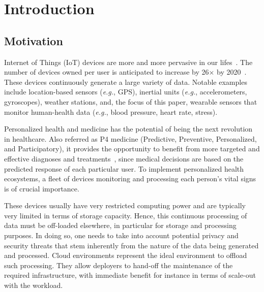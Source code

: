 \chapter{Introduction} \label{chap:introduction}

\section{Motivation}

Internet of Things (IoT) devices are more and more pervasive in our lifes~\cite{Gartner2017}.
The number of devices owned per user is anticipated to increase by 26$\times$ by 2020~\cite{Barbosa2017}.
These devices continuously generate a large variety of data.
Notable examples include location-based sensors (\emph{e.g.}, GPS), inertial units (\emph{e.g.}, accelerometers, gyroscopes), weather stations, and, the focus of this paper, wearable sensors that monitor human-health data (\emph{e.g.}, blood pressure, heart rate, stress).

Personalized health and medicine has the potential of being the next revolution in healthcare.
Also referred as P4 medicine (Predictive, Preventive, Personalized, and Participatory), it provides the opportunity to benefit from more targeted and effective diagnoses and treatments~\cite{Cumming2014}, since medical decisions are based on the predicted response of each particular user.
To implement personalized health ecosystems, a fleet of devices monitoring and processing each person's vital signs is of crucial importance.

These devices usually have very restricted computing power and are typically very limited in terms of storage capacity.
Hence, this continuous processing of data must be off-loaded elsewhere, in particular for storage and processing purposes.
In doing so, one needs to take into account potential privacy and security threats that stem inherently from the nature of the data being generated and processed.
Cloud environments represent the ideal environment to offload such processing.
They allow deployers to hand-off the maintenance of the required infrastructure, with immediate benefit for instance in terms of scale-out with the workload. 

